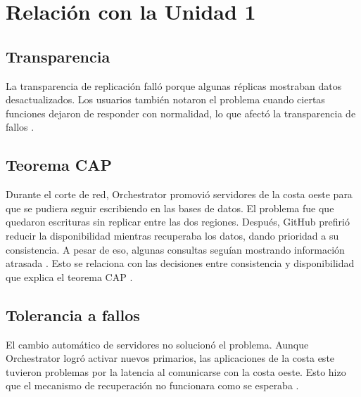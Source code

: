 
\section{Relación con la Unidad 1}
\label{sec:unidad1}

\subsection{Transparencia}
La transparencia de replicación falló porque algunas réplicas mostraban datos desactualizados. Los usuarios también notaron el problema cuando ciertas funciones dejaron de responder con normalidad, lo que afectó la transparencia de fallos \cite{Warner2018}.

\subsection{Teorema CAP}
Durante el corte de red, Orchestrator promovió servidores de la costa oeste para que se pudiera seguir escribiendo en las bases de datos. El problema fue que quedaron escrituras sin replicar entre las dos regiones. Después, GitHub prefirió reducir la disponibilidad mientras recuperaba los datos, dando prioridad a su consistencia. A pesar de eso, algunas consultas seguían mostrando información atrasada \cite{Warner2018}. Esto se relaciona con las decisiones entre consistencia y disponibilidad que explica el teorema CAP \cite{Gilbert2002,Brewer2012}.

\subsection{Tolerancia a fallos}
El cambio automático de servidores no solucionó el problema. Aunque Orchestrator logró activar nuevos primarios, las aplicaciones de la costa este tuvieron problemas por la latencia al comunicarse con la costa oeste. Esto hizo que el mecanismo de recuperación no funcionara como se esperaba \cite{Warner2018}.

